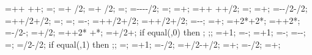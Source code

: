 {{\engbedrockdeltax=\leftsoildist+\engbedrockleftdist+
  \buildingwidth+\rightsoildist+\engbedrockrightdist;
\engbedrockdeltay=\engbedrockdepth;
\engbedrockmidx=\engbedrockstartx + \engbedrockdeltax/2;
\engbedrockmidy=\engbedrockstarty + \engbedrockdeltay/2;
\translayerlinet=\showtranslayer*\translayerlinet;
\translayerleftstartx=-\supportwidth-\hsdistleft-\leftsoildist-\translayerlinet/2;
\translayerleftstarty=\leftwallh;
\translayerleftdeltay=\leftwallh+\soilbelowfoundtof;
\translayerrightstartx=\supportwidth+\hsdistright+
	\rightsoildist+\buildingwidth+\translayerlinet/2;
\translayerrightstarty=\rightwallh;
\translayerrightdeltay=\rightwallh+\soilbelowfoundtof;
\ssinterleftstartx=-\supportwidth-\baselinet/2-\ssinterlinet/2;
\ssinterrightstartx=\buildingwidth+\supportwidth+\baselinet/2+\ssinterlinet/2;
\ssinterleftstarty=\leftwallh;
\ssinterrightstarty=\rightwallh;
\ssinterdeltax=\ssinterrightstartx-\ssinterleftstartx;
\ssinterleftdeltay=\leftwallh+\supportheight+\baselinet/2+\ssinterlinet/2;
\ssinterrightdeltay=\rightwallh+\supportheight+\baselinet/2+\ssinterlinet/2;
\markssleftstartx=-\supportwidth-\markssexspace;
\markssleftstarty=\basewalldepth+\markssexspace;
\markssdeltax=\buildingwidth+2*\supportwidth+2*\markssexspace;
\markssdeltay=\basewalldepth+\supportheight+2*\markssexspace;
\supershadestartx=-\collinet/2-\supershadespace;
\supershadestarty=\basewalldepth+\baselinet/2;
\supershadedeltax=\buildingwidth+\collinet+2*\supershadespace
 +*\showdefl;
\supershadedeltay=\superstorynumber*\storyheight+\beamlinet/2+\supershadespace;
if equal(\showlessbays,0) then {
;
;};
\startcol=\leftbays+1;
\endcol=\columnnumber-\rightbays;
\startbeam=\leftbays+1;
\endbeam=\baynumber-\rightbays;
\superbays=\baynumber-\leftbays-\rightbays;
\superwidth=\superbays*\baywidth;
\groundbeamshifty=\groundbeamlinet/2-\baselinet/2;
if equal(\showdefl,1) then {;};
\shearwallstartcolumn=\shearwallbay;
\shearwallendcolumn=\shearwallbay+1;
\shearwallstartx=\x{\shearwallstartcolumn}-\collinet/2;
\shearwallstarty=+\baselinet/2-+\shearwalllinet/2;
\shearwalldeltax=\baywidth+\collinet;
\shearwallsupportstartx=\shearwallstartx-\supportwidth/2;
\shearwallsupportdeltax=\shearwalldeltax+\supportwidth;
}}
